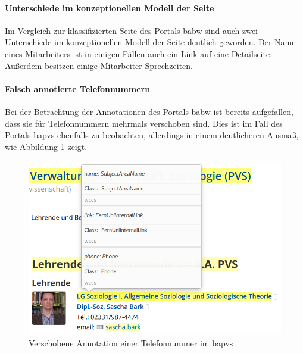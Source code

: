     \paragraph{Unterschiede im konzeptionellen Modell der Seite}
    Im Vergleich zur klassifizierten Seite des Portals \gls{babw}
    sind auch zwei Unterschiede im konzeptionellen Modell der Seite deutlich geworden.
    Der Name eines Mitarbeiters ist in einigen Fällen
    auch ein Link auf eine Detailseite.
    Außerdem besitzen einige Mitarbeiter Sprechzeiten.

    \paragraph{Falsch annotierte Telefonnummern}
    Bei der Betrachtung der Annotationen des Portals \gls{babw}
    ist bereits aufgefallen, dass sie für Telefonnummern
    mehrmals verschoben sind.
    Dies ist im Fall des Portals \gls{bapvs} ebenfalls zu beobachten,
    allerdings in einem deutlicheren Ausmaß,
    wie Abbildung \ref{image:findingTeachersBaPVSWrongPhone} zeigt.

    \begin{figure}[htb]
        \centering
        \includegraphics[scale=\screenshotScaleFactor]{../resources/findings/case-study-1/bapvs/annotations/triple-annotation.png}
        \caption{Verschobene Annotation einer Telefonnummer im \acrshort{bapvs}}
        \label{image:findingTeachersBaPVSWrongPhone}
    \end{figure}

